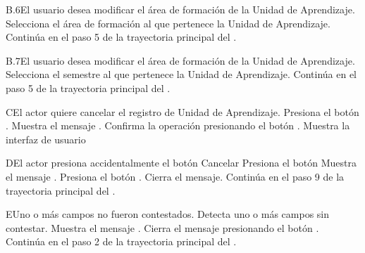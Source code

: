 
\begin{UCtrayectoriaA}{B.6}{El usuario desea modificar el área de formación de la Unidad de Aprendizaje.}
	\UCpaso[\UCactor] Selecciona el área de formación al que pertenece la Unidad de Aprendizaje.
	\UCpaso Continúa en el paso 5 de la trayectoria principal del .
\end{UCtrayectoriaA}



\begin{UCtrayectoriaA}{B.7}{El usuario desea modificar el área de formación de la Unidad de Aprendizaje.}
	\UCpaso[\UCactor] Selecciona el semestre al que pertenece la Unidad de Aprendizaje.
	\UCpaso Continúa en el paso 5 de la trayectoria principal del .
\end{UCtrayectoriaA}




\begin{UCtrayectoriaA}{C}{El actor quiere cancelar el registro de Unidad de Aprendizaje.}
	\UCpaso[\UCactor] Presiona el botón .
	\UCpaso Muestra el mensaje .
	\UCpaso[\UCactor] Confirma la operación presionando el botón .
	\UCpaso Muestra la interfaz de usuario 
\end{UCtrayectoriaA}




\begin{UCtrayectoriaA}{D}{El actor presiona accidentalmente el botón Cancelar}
	\UCpaso[\UCactor] Presiona el botón 
	\UCpaso Muestra el mensaje .
	\UCpaso[\UCactor] Presiona el botón .
	\UCpaso Cierra el mensaje.
	\UCpaso Continúa en el paso 9 de la trayectoria principal del .
\end{UCtrayectoriaA}




\begin{UCtrayectoriaA}{E}{Uno o más campos no fueron contestados.}
	\UCpaso Detecta uno o más campos sin contestar.
	\UCpaso Muestra el mensaje .
	\UCpaso[\UCactor] Cierra el mensaje presionando el botón .
	\UCpaso Continúa en el paso 2 de la trayectoria principal del .
\end{UCtrayectoriaA}